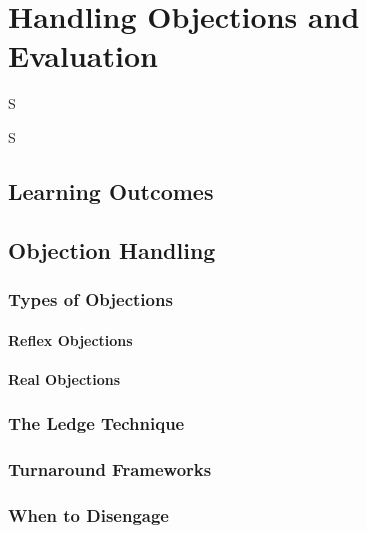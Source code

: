 \frenchspacing
\chapter{Handling Objections and Evaluation}
\epigraph{S}{S}

%
\section{Learning Outcomes}

\section{Objection Handling}\mbox{}
    \subsection{Types of Objections}\mbox{}
        \subsubsection{Reflex Objections}\mbox{}
        \subsubsection{Real Objections}\mbox{}
    \subsection{The Ledge Technique}\mbox{}
    \subsection{Turnaround Frameworks}\mbox{}
    \subsection{When to Disengage}\mbox{}

%
\printbibliography[heading=secbibliography, title={References}]
